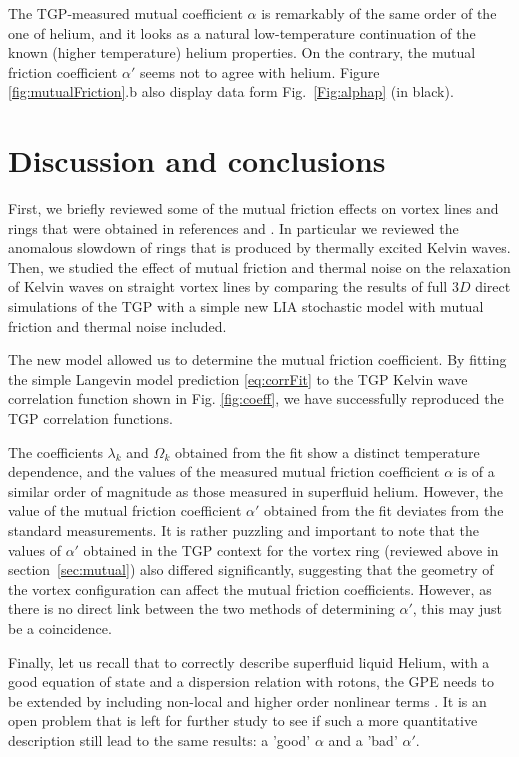 \documentclass[sn-mathphys]{sn-jnl}%
\begin{document}
The TGP-measured mutual coefficient $\alpha$ is remarkably of the same order of the one of helium, and it looks as a natural low-temperature continuation of the known (higher temperature) helium properties. On the contrary, the mutual friction coefficient $\alpha'$ seems not to agree with helium. Figure \ref{fig:mutualFriction}.b also display data form Fig.~\ref{Fig:alphap} (in black).

\section{Discussion and conclusions} \label{sec:Conclusion}

First, we briefly reviewed some of the mutual friction effects on vortex lines and rings that were obtained in references \cite{Krstulovic11} and \cite{Krstulovic11b}. In particular we reviewed the anomalous slowdown of rings that is produced by thermally excited Kelvin waves. Then, we studied the effect of mutual friction and thermal noise on the relaxation of Kelvin waves on straight vortex lines by comparing the results of full $3D$ direct simulations of the TGP with a simple new LIA stochastic model with mutual friction and thermal noise included. 

The new model allowed us to determine the mutual friction coefficient. By fitting the simple Langevin model prediction \eqref{eq:corrFit} to the TGP Kelvin wave correlation function shown in Fig. \ref{fig:coeff}, we have successfully reproduced the TGP correlation functions. 

The coefficients $\lambda_k$ and $\Omega_k$ obtained from the fit show a distinct temperature dependence, and the values of the measured mutual friction coefficient $\alpha$ is of a similar order of magnitude as those measured in superfluid helium. However, the value of the mutual friction coefficient $\alpha'$ obtained from the fit deviates from the standard measurements. It is rather puzzling and important to note that the values of $\alpha'$ obtained in the TGP context for the vortex ring (reviewed above in section~\ref{sec:mutual}) also differed significantly, suggesting that the geometry of the vortex configuration can affect the mutual friction coefficients. However, as there is no direct link between the two methods of determining $\alpha'$, this may just be a coincidence.

Finally, let us recall that to correctly describe superfluid liquid Helium, with a good equation of state and a dispersion relation with rotons, 
the GPE needs to be extended by including  non-local and higher order nonlinear terms \cite{Berloff_MotionsBoseCondensate_1999,Muller_CriticalVelocityVortex_2022,Muller_KolmogorovKelvinWave_2020}. 
It is an open problem that is left for further study to see if such a more quantitative description still lead to the same results: 
a 'good' $\alpha$ and a 'bad' $\alpha'$.
\end{document}
